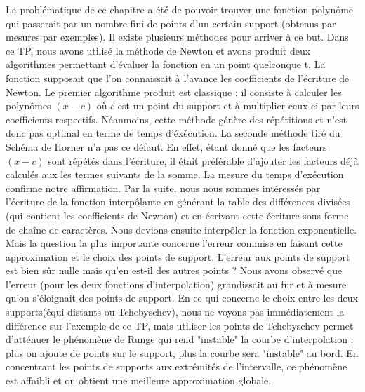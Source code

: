 \documentclass[a4paper,10pt]{report}
\begin{document}
La problématique de ce chapitre a été de pouvoir trouver une fonction polynôme qui passerait par un nombre fini de points d’un certain support (obtenus par mesures par exemples). Il existe plusieurs méthodes pour arriver à ce but.
\newline
\newline
Dans ce TP, nous avons utilisé la méthode de Newton et avons produit deux algorithmes permettant d’évaluer la fonction en un point quelconque t. La fonction supposait que l’on connaissait à l’avance les coefficients de l’écriture de Newton.
\newline
\newline
Le premier algorithme produit est classique : il consiste à calculer les polynômes $(x-c)$ où $c$ est un point du support et à multiplier ceux-ci par leurs coefficients respectifs. Néanmoins, cette méthode génère des répétitions et n’est donc pas optimal en terme de temps d’éxécution.
\newline
\newline 
La seconde méthode tiré du Schéma de Horner n’a pas ce défaut. En effet, étant donné que les facteurs $(x-c)$ sont répétés dans l’écriture, il était préférable d’ajouter les facteurs déjà calculés aux les termes suivants de la somme.
\newline
\newline
La mesure du temps d’exécution confirme notre affirmation.
\newline
\newline
Par la suite, nous nous sommes intéressés par l’écriture de la fonction interpôlante en générant la table des différences divisées (qui contient les coefficients de Newton) et en écrivant cette écriture sous forme de chaîne de caractères. Nous devions ensuite interpôler la fonction exponentielle. 
\newline
\newline
Mais la question la plus importante concerne l’erreur commise en faisant cette approximation et le choix des points de support. L’erreur aux points de support est bien sûr nulle mais qu’en est-il des autres points ? 
\newline
\newline
Nous avons observé que l’erreur (pour les deux fonctions d'interpolation) grandissait au fur et à mesure qu’on s’éloignait des points de support. En ce qui concerne le choix entre les deux supports(équi-distants ou Tchebyschev), nous ne voyons pas immédiatement la différence sur l'exemple de ce TP, mais utiliser les points de Tchebyschev permet d'atténuer le phénomène de Runge qui rend "instable" la courbe d'interpolation : plus on ajoute de points sur le support, plus la courbe sera "instable" au bord. En concentrant les points de supports aux extrémités de l'intervalle, ce phénomène est affaibli et on obtient une meilleure approximation globale. 
\end{document}
